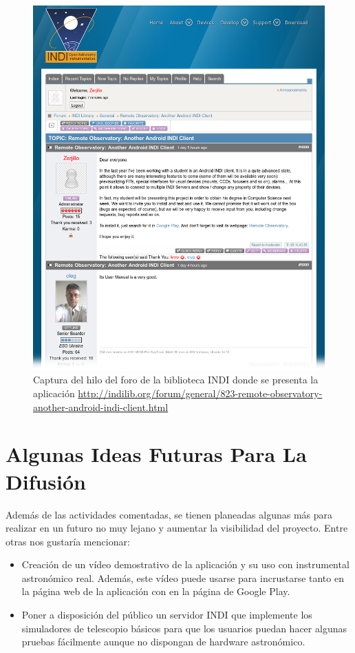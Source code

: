 \begin{figure}
 \centering
 \includegraphics[width=12cm]{../images/indiForum2.png}
 \caption{Captura del hilo del foro de la biblioteca INDI donde se presenta la aplicación \protect\href{http://indilib.org/forum/general/823-remote-observatory-another-android-indi-client.html}{http://indilib.org/forum/general/823-remote-observatory-another-android-indi-client.html}}
 \label{fig:indiForum}
\end{figure}



\section{Algunas Ideas Futuras Para La Difusión}

Además de las actividades comentadas, se tienen planeadas algunas más para realizar en un futuro no muy lejano y aumentar la visibilidad del proyecto. Entre otras nos gustaría mencionar:

\begin{itemize}
  \item Creación de un vídeo demostrativo de la aplicación y su uso con instrumental astronómico real. Además, este vídeo puede usarse para incrustarse tanto en la página web de la aplicación con en la página de Google Play.
  
  \item Poner a disposición del público un servidor INDI que implemente los simuladores de telescopio básicos para que los usuarios puedan hacer algunas pruebas fácilmente aunque no dispongan de hardware astronómico.
\end{itemize}